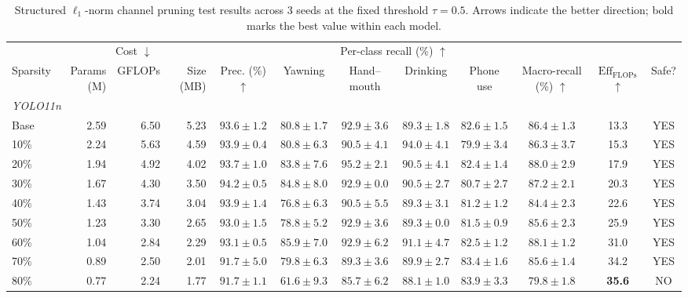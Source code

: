 \documentclass[conference]{IEEEtran}
\begin{document}
\begin{table}[!t]
\renewcommand{\arraystretch}{0.85}
\caption{Structured $\ell_1$-norm channel pruning test results across 3 seeds at the fixed threshold $\tau = 0.5$. Arrows indicate the better direction; bold marks the best value within each model.}
\label{tab:pruning_fixed_tau}
\centering
\scriptsize
\setlength{\tabcolsep}{2.6pt}
\begin{tabular}{l rrr c cccc c c c}
\toprule
 & \multicolumn{3}{c}{Cost $\downarrow$} & & \multicolumn{4}{c}{Per-class recall (\%) $\uparrow$} & & & \\
\cmidrule(lr){2-4}\cmidrule(lr){6-9}
Sparsity & Params (M) & GFLOPs & Size (MB) & Prec. (\%) $\uparrow$ & Yawning & Hand--mouth & Drinking & Phone use & Macro-recall (\%) $\uparrow$ & $\text{Eff}_{\text{FLOPs}}$ $\uparrow$ & Safe? \\
\midrule
\multicolumn{12}{l}{\textit{YOLO11n}} \\
Base  & 2.59 & 6.50 & 5.23 & $93.6\pm1.2$ & $80.8\pm1.7$ & $92.9\pm3.6$ & $89.3\pm1.8$ & $82.6\pm1.5$ & $86.4\pm1.3$ & 13.3 & YES \\
10\%  & 2.24 & 5.63 & 4.59 & $93.9\pm0.4$ & $80.8\pm6.3$ & $90.5\pm4.1$ & $\mathbf{94.0}\pm\mathbf{4.1}$ & $79.9\pm3.4$ & $86.3\pm3.7$ & 15.3 & YES \\
20\%  & 1.94 & 4.92 & 4.02 & $93.7\pm1.0$ & $83.8\pm7.6$ & $\mathbf{95.2}\pm\mathbf{2.1}$ & $90.5\pm4.1$ & $82.4\pm1.4$ & $88.0\pm2.9$ & 17.9 & YES \\
30\%  & 1.67 & 4.30 & 3.50 & $\mathbf{94.2}\pm\mathbf{0.5}$ & $84.8\pm8.0$ & $92.9\pm0.0$ & $90.5\pm2.7$ & $80.7\pm2.7$ & $87.2\pm2.1$ & 20.3 & YES \\
40\%  & 1.43 & 3.74 & 3.04 & $93.9\pm1.4$ & $76.8\pm6.3$ & $90.5\pm5.5$ & $89.3\pm3.1$ & $81.2\pm1.2$ & $84.4\pm2.3$ & 22.6 & YES \\
50\%  & 1.23 & 3.30 & 2.65 & $93.0\pm1.5$ & $78.8\pm5.2$ & $92.9\pm3.6$ & $89.3\pm0.0$ & $81.5\pm0.9$ & $85.6\pm2.3$ & 25.9 & YES \\
60\%  & 1.04 & 2.84 & 2.29 & $93.1\pm0.5$ & $\mathbf{85.9}\pm\mathbf{7.0}$ & $92.9\pm6.2$ & $91.1\pm4.7$ & $82.5\pm1.2$ & $\mathbf{88.1}\pm\mathbf{1.2}$ & 31.0 & YES \\
70\%  & 0.89 & 2.50 & 2.01 & $91.7\pm5.0$ & $79.8\pm6.3$ & $89.3\pm3.6$ & $89.9\pm2.7$ & $83.4\pm1.6$ & $85.6\pm1.4$ & 34.2 & YES \\
80\%  & 0.77 & 2.24 & 1.77 & $91.7\pm1.1$ & $61.6\pm9.3$ & $85.7\pm6.2$ & $88.1\pm1.0$ & $\mathbf{83.9}\pm\mathbf{3.3}$ & $79.8\pm1.8$ & \textbf{35.6} & NO \\

\end{tabular}
\end{table}
\end{document}
